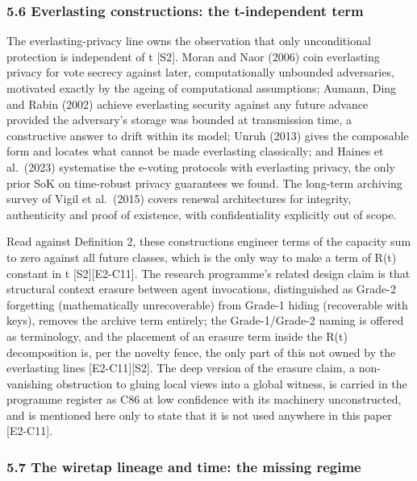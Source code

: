 \documentclass[
  11pt,
]{article}
\begin{document}
\subsubsection{5.6 Everlasting constructions: the t-independent
term}\label{everlasting-constructions-the-t-independent-term}

The everlasting-privacy line owns the observation that only
unconditional protection is independent of t {[}S2{]}. Moran and Naor
(2006) coin everlasting privacy for vote secrecy against later,
computationally unbounded adversaries, motivated exactly by the ageing
of computational assumptions; Aumann, Ding and Rabin (2002) achieve
everlasting security against any future advance provided the adversary's
storage was bounded at transmission time, a constructive answer to drift
within its model; Unruh (2013) gives the composable form and locates
what cannot be made everlasting classically; and Haines et al.~(2023)
systematise the e-voting protocols with everlasting privacy, the only
prior SoK on time-robust privacy guarantees we found. The long-term
archiving survey of Vigil et al.~(2015) covers renewal architectures for
integrity, authenticity and proof of existence, with confidentiality
explicitly out of scope.

Read against Definition 2, these constructions engineer terms of the
capacity sum to zero against all future classes, which is the only way
to make a term of R(t) constant in t {[}S2{]}{[}E2-C11{]}. The research
programme's related design claim is that structural context erasure
between agent invocations, distinguished as Grade-2 forgetting
(mathematically unrecoverable) from Grade-1 hiding (recoverable with
keys), removes the archive term entirely; the Grade-1/Grade-2 naming is
offered as terminology, and the placement of an erasure term inside the
R(t) decomposition is, per the novelty fence, the only part of this not
owned by the everlasting lines {[}E2-C11{]}{[}S2{]}. The deep version of
the erasure claim, a non-vanishing obstruction to gluing local views
into a global witness, is carried in the programme register as C86 at
low confidence with its machinery unconstructed, and is mentioned here
only to state that it is not used anywhere in this paper {[}E2-C11{]}.

\subsubsection{5.7 The wiretap lineage and time: the missing
regime}\label{the-wiretap-lineage-and-time-the-missing-regime}
\end{document}
